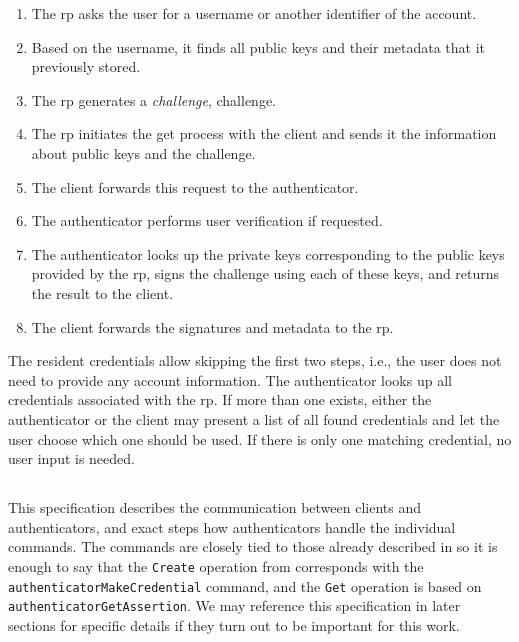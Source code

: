 \begin{enumerate}
	\item The \gls{rp} asks the user for a username or another identifier of the account.
	\item Based on the username, it finds all public keys and their metadata that it previously stored.
	\item The \gls{rp} generates a \emph{challenge}, \glsdesc{challenge}.
	\item The \gls{rp} initiates the get process with the client and sends it the information about public keys and the challenge.
	\item The client forwards this request to the authenticator.
	\item The authenticator performs user verification if requested.
	\item The authenticator looks up the private keys corresponding to the public keys provided by the \gls{rp}, signs the challenge using each of these keys, and returns the result to the client.
	\item The client forwards the signatures and metadata to the \gls{rp}.
\end{enumerate}

The resident credentials allow skipping the first two steps, i.e., the user does not
need to provide any account information. The authenticator looks up all credentials
associated with the \gls{rp}. If more than one exists, either the authenticator or
the client may present a list of all found credentials and let the user choose which
one should be used. If there is only one matching credential, no user input is needed.

\subsection{}\label{subsec:ctap}

This specification describes the communication between clients and authenticators,
and exact steps how authenticators handle the individual commands. The commands
are closely tied to those already described in  so it is enough to
say that the \texttt{Create} operation from  corresponds with
the \texttt{authenticatorMakeCredential} command, and the \texttt{Get} operation
is based on \texttt{authenticatorGetAssertion}. We may reference this specification
in later sections for specific details if they turn out to be important for this work.


